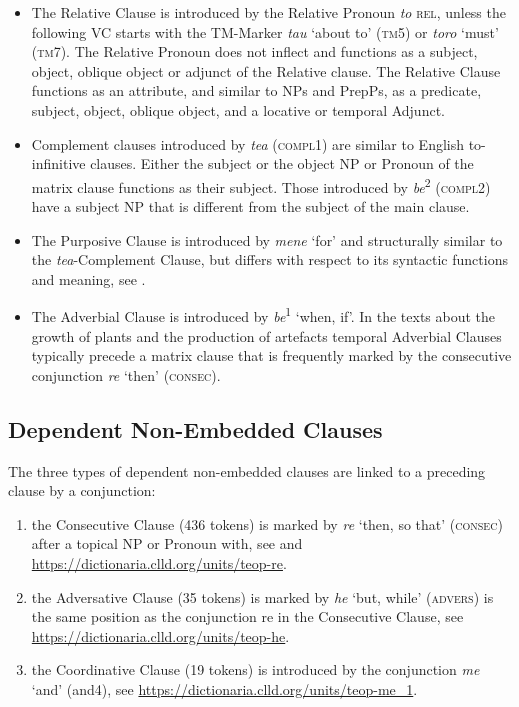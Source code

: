 \documentclass[output=paper]{langscibook}
\begin{document}
\begin{itemize}
    \item The Relative Clause is introduced by the Relative Pronoun \textit{to} \textsc{rel}, unless the following VC starts with the TM-Marker \textit{tau} `about to' (\textsc{tm}5) or \textit{toro} `must' (\textsc{tm}7). The Relative Pronoun does not inflect and functions as a subject, object, oblique object or adjunct of the Relative clause. The Relative Clause functions as an attribute, and similar to NPs and PrepPs, as a predicate, subject, object, oblique object, and a locative or temporal Adjunct.
    \item Complement clauses introduced by \textit{tea} (\textsc{compl}1) are similar to English to-infinitive clauses. Either the subject or the object NP or Pronoun of the matrix clause functions as their subject. Those introduced by \textit{be}\textsuperscript{2} (\textsc{compl}2) have a subject NP that is different from the subject of the main clause. 
    \item The Purposive Clause is introduced by \textit{mene} `for' and structurally similar to the \textit{tea}-Complement Clause, but differs with respect to its syntactic functions and meaning, see .
    \item The Adverbial Clause is introduced by \textit{be}\textsuperscript{1} `when, if'. In the texts about the growth of plants and the production of artefacts temporal Adverbial Clauses typically precede a matrix clause that is frequently marked by the consecutive conjunction \textit{re} `then' (\textsc{consec}).
\end{itemize}


\subsection{Dependent Non-Embedded Clauses}\label{sec:depnonclause}

The three types of dependent non-embedded clauses are linked to a preceding clause by a conjunction:

\begin{enumerate}
    \item the Consecutive Clause (436 tokens) is marked by \textit{re} `then, so that' (\textsc{consec}) after a topical NP or Pronoun with, see  and \url{https://dictionaria.clld.org/units/teop-re}.
    \item the Adversative Clause (35 tokens) is marked by \textit{he} `but, while' (\textsc{advers}) is the same position as the conjunction re in the Consecutive Clause, see \url{https://dictionaria.clld.org/units/teop-he}. 
    \item the Coordinative Clause (19 tokens) is introduced by the conjunction \textit{me} `and' (and4), see \url{https://dictionaria.clld.org/units/teop-me\_1}.
\end{enumerate}
\end{document}
